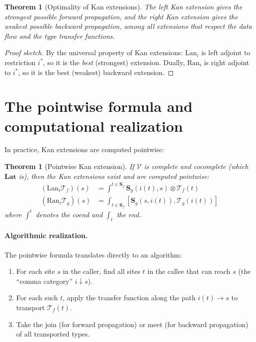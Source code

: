 \documentclass[11pt]{report}
\theoremstyle{definition}
\theoremstyle{plain}
\newtheorem{theorem}[definition]{Theorem}
\begin{document}
\begin{theorem}[Optimality of Kan extensions]
The left Kan extension gives the strongest possible forward propagation, and
the right Kan extension gives the weakest possible backward propagation,
among all extensions that respect the data flow and the type transfer
functions.
\end{theorem}

\begin{proof}[Proof sketch]
By the universal property of Kan extensions: $\mathrm{Lan}_i$ is left adjoint
to restriction $i^*$, so it is the \emph{best} (strongest) extension. Dually,
$\mathrm{Ran}_i$ is right adjoint to $i^*$, so it is the best (weakest)
backward extension.
\end{proof}

\section{The pointwise formula and computational realization}

In practice, Kan extensions are computed pointwise:

\begin{theorem}[Pointwise Kan extension]
If $\mathcal{V}$ is complete and cocomplete (which $\mathbf{Lat}$ is), then
the Kan extensions exist and are computed pointwise:
\begin{align*}
  (\mathrm{Lan}_i \mathcal{T}_f)(s) &= \int^{t \in \mathbf{S}_f}
    \mathbf{S}_g(i(t), s) \otimes \mathcal{T}_f(t) \\
  (\mathrm{Ran}_i \mathcal{T}_g)(s) &= \int_{t \in \mathbf{S}_f}
    [\mathbf{S}_g(s, i(t)), \mathcal{T}_g(i(t))]
\end{align*}
where $\int^t$ denotes the coend and $\int_t$ the end.
\end{theorem}

\paragraph{Algorithmic realization.}
The pointwise formula translates directly to an algorithm:
\begin{enumerate}[nosep]
  \item For each site $s$ in the caller, find all sites $t$ in the callee
        that can reach $s$ (the ``comma category'' $i \downarrow s$).
  \item For each such $t$, apply the transfer function along the path
        $i(t) \to s$ to transport $\mathcal{T}_f(t)$.
  \item Take the join (for forward propagation) or meet (for backward
        propagation) of all transported types.
\end{enumerate}
\end{document}
